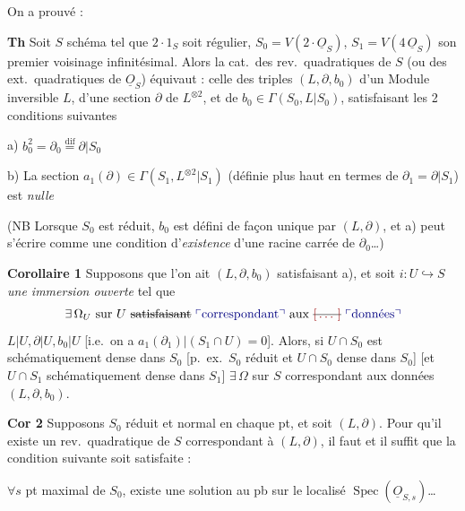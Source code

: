 \documentclass[11pt,a4paper]{article}
\begin{document}
On a prouvé :

\textbf{Th} Soit $S$ schéma tel que $2 \cdot 1_S$ soit régulier,
$S_0 = V(2 \cdot \underline{O}_S)$, $S_1 = V(4\,\underline{O}_S)$ son premier voisinage
infinitésimal. 
Alors la cat.\ des rev.\ quadratiques de $S$ (ou des ext.\ quadratiques de $\underline{O}_S$)
équivaut : celle des triples $(L, \partial, b_0)$ d'un Module
inversible $L$, d'une section $\partial$ de $L^{\otimes 2}$, et de 
$b_0 \in \Gamma(S_0, L|S_0)$, satisfaisant les 2 conditions suivantes

a)  $b_0^2 = \partial_0 \overset{\mathrm{dif}}{=} \partial | S_0$

b) La section $a_1(\partial) \in \Gamma(S_1, L^{\otimes 2}|S_1)$ (définie plus haut
 en termes de $\partial_1 = \partial|S_1$) est \emph{nulle}

(NB Lorsque $S_0$ est réduit, $b_0$ est défini de façon unique par $(L, \partial)$,
et a) peut s'écrire comme une condition d'\emph{existence} d'une racine carrée
de $\partial_0$\ldots)

\textbf{Corollaire 1} Supposons que l'on ait $(L, \partial, b_0)$ satisfaisant a),
et soit \struck{\ill{}} $i : U \hookrightarrow S$ \emph{une immersion ouverte}
tel que \struck{\ill{}}
\[
\exists\, \Omega_U \text{ sur } U \text{ \struck{satisfaisant}} \text{ \add{correspondant} aux }
\text{\struck{\ill{}}} \text{ \add{données}}
\]
$L|U, \partial|U, b_0|U$ [i.e.\ on a $a_1(\partial_1)|(S_1 \cap U) = 0$].
Alors, si $U \cap S_0$ est schématiquement dense dans $S_0$
[p.\ ex.\ $S_0$ réduit et $U \cap S_0$ dense dans $S_0$] [et
$U \cap S_1$ schématiquement dense dans $S_1$] 
$\exists\, \Omega$ sur $S$ correspondant aux données $(L, \partial, b_0)$.

\textbf{Cor 2}  Supposons $S_0$ réduit et
normal en chaque pt, et soit $(L, \partial)$. 
Pour qu'il existe un \struck{$\Omega$ \ill{}} rev.\ quadratique
de $S$ correspondant à $(L, \partial)$, il faut et il suffit
que la condition suivante soit satisfaite :

$\forall s$ pt maximal de $S_0$, existe une solution
au pb sur le localisé $\operatorname{Spec}(\underline{O}_{S,s})$\ldots
\end{document}
